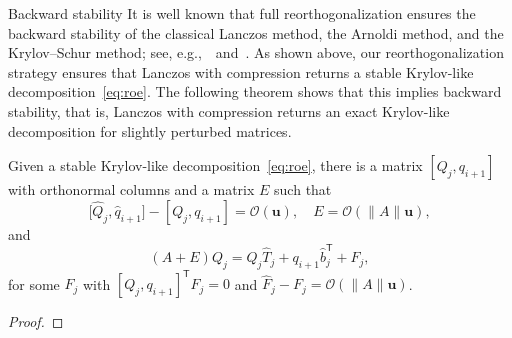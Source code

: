 \documentclass{siamart190516}
\newcommand{\Ttran}{\mathsf{T}}
\newcommand{\order}{\mathcal{O}}
\newcommand{\mpr}{\mathbf{u}}
\providecommand{\norm}[1]{\lVert#1\rVert}
\begin{document}
\begin{paragraph}{Backward stability}
It is well known that full reorthogonalization ensures the backward stability of the classical Lanczos method, the Arnoldi method, and the Krylov--Schur method; see, e.g.,~\cite[Thm.~4.1]{stewart2002krylov}~and~\cite[Chap.~5, Thm.2.5]{Stewart2001}.
As shown above, our reorthogonalization strategy ensures that Lanczos with compression returns a stable Krylov-like decomposition~\cref{eq:roe}. 
The following theorem shows that this implies backward stability, that is, Lanczos with compression returns an exact Krylov-like decomposition for slightly perturbed matrices.
\begin{theorem}
    \label{thmBS}
    Given a stable Krylov-like decomposition~\cref{eq:roe}, there is a matrix $[Q_j,q_{i+1}]$ with orthonormal columns
    and a matrix $E$ such that
    \[
     \big[\widehat{Q}_{j}, \widehat q_{i+1}\big] - [Q_j,q_{i+1}] = \order(\mpr),\quad E = \order(\norm{A}\mpr),
    \]
and
\begin{equation}
\label{eq:bs}
    (A+E){Q}_{j} = {Q}_{j}\widehat{T}_{j}+{q}_{i+1}\widehat{b}_{j}^{\Ttran}+{F}_{j},
\end{equation}
for some ${F}_{j}$ with $[Q_{j},q_{i+1}]^{\Ttran} F_j = 0$ and $\widehat F_j - F_j = \order(\norm{A}\mpr)$.
\end{theorem}
\begin{proof}


\end{proof}
\end{paragraph}
\end{document}
